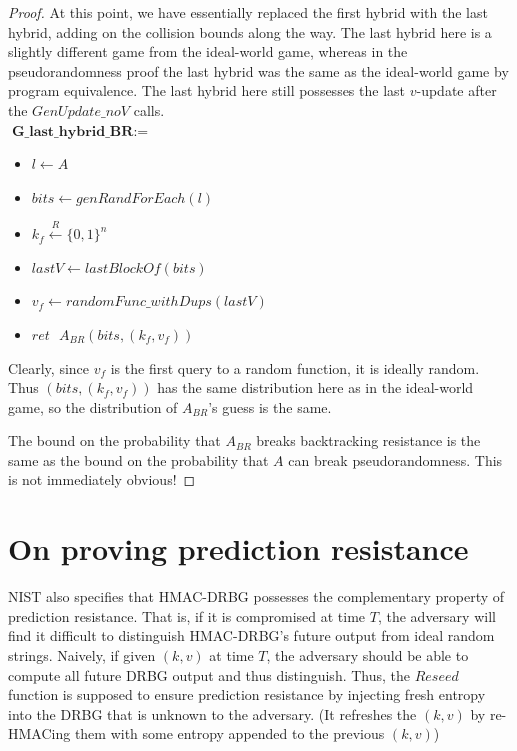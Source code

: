 \documentclass[12pt,lot, lof]{puthesis}
\newenvironment{game}
{ \begin{itemize}[noitemsep,nolistsep] 
}
{ \end{itemize}                  }
\newcommand{\s} {\textrm{ }}
\newcommand{\samp}{\xleftarrow{R} \{0,1\}}
\newcommand{\lar}{\leftarrow}
\begin{document}
{\begin{proof}
At this point, we have essentially replaced the first hybrid with the last hybrid, adding on the collision bounds along the way. The last hybrid here is a slightly different game from the ideal-world game, whereas in the pseudorandomness proof the last hybrid was the same as the ideal-world game by program equivalence. The last hybrid here still possesses the last $v$-update after the $GenUpdate\_noV$ calls.\\

$\textbf{G\_last\_hybrid\_BR} := $
\begin{game}
\item[] $l \leftarrow A$ 
\item[] $bits \leftarrow genRandForEach(l)$
\item[] $k_f \samp^n$
\item[] $lastV \lar lastBlockOf(bits)$
\item[] $v_f \lar randomFunc\_withDups(lastV)$
\item[] $ret \s A_{BR}(bits, (k_f,v_f))$ \\
\end{game}

Clearly, since $v_f$ is the first query to a random function, it is ideally random. Thus $(bits, (k_f, v_f))$ has the same distribution here as in the ideal-world game, so the distribution of $A_{BR}$'s guess is the same.

The bound on the probability that $A_{BR}$ breaks backtracking resistance is the same as the bound on the probability that $A$ can break pseudorandomness. This is not immediately obvious!

\end{proof}

\section{On proving prediction resistance} \label{sec:on_proving_prediction_resistance}

NIST also specifies that HMAC-DRBG possesses the complementary property of prediction resistance. That is, if it is compromised at time $T$, the adversary will find it difficult to distinguish HMAC-DRBG's future output from ideal random strings. Naively, if given $(k, v)$ at time $T$, the adversary should be able to compute all future DRBG output and thus distinguish. Thus, the $Reseed$ function is supposed to ensure prediction resistance by injecting fresh entropy into the DRBG that is unknown to the adversary. (It refreshes the $(k,v)$ by re-HMACing them with some entropy appended to the previous $(k,v)$)

}
\end{document}
